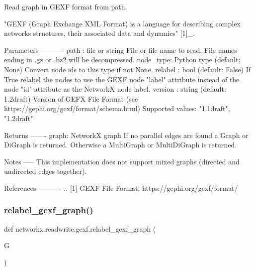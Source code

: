 \begin{DoxyVerb}Read graph in GEXF format from path.

"GEXF (Graph Exchange XML Format) is a language for describing
complex networks structures, their associated data and dynamics" [1]_.

Parameters
----------
path : file or string
   File or file name to read.
   File names ending in .gz or .bz2 will be decompressed.
node_type: Python type (default: None)
   Convert node ids to this type if not None.
relabel : bool (default: False)
   If True relabel the nodes to use the GEXF node "label" attribute
   instead of the node "id" attribute as the NetworkX node label.
version : string (default: 1.2draft)
Version of GEFX File Format (see https://gephi.org/gexf/format/schema.html)
   Supported values: "1.1draft", "1.2draft"

Returns
-------
graph: NetworkX graph
    If no parallel edges are found a Graph or DiGraph is returned.
    Otherwise a MultiGraph or MultiDiGraph is returned.

Notes
-----
This implementation does not support mixed graphs (directed and undirected
edges together).

References
----------
.. [1] GEXF File Format, https://gephi.org/gexf/format/
\end{DoxyVerb}
 \mbox{\label{namespacenetworkx_1_1readwrite_1_1gexf_a5202a23d84be986045b3af98480020e3}} 
\subsubsection{\texorpdfstring{relabel\+\_\+gexf\+\_\+graph()}{relabel\_gexf\_graph()}}
{\footnotesize\ttfamily def networkx.\+readwrite.\+gexf.\+relabel\+\_\+gexf\+\_\+graph (\begin{DoxyParamCaption}\item[{}]{G }\end{DoxyParamCaption})}

